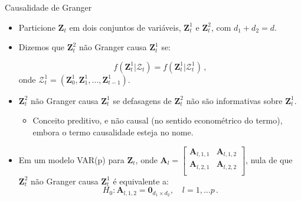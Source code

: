 \documentclass[11pt]{beamer}
\begin{document}
\begin{frame}{Causalidade de Granger}
	\begin{itemize}
		\item Particione $\boldsymbol{Z}_t$ em dois conjuntos de variáveis, $\boldsymbol{Z}^1_t$ e $\boldsymbol{Z}^2_t$, com $d_1 + d_2 = d$.
		\item Dizemos que $\boldsymbol{Z}^2_t$ {\color{blue}não Granger causa} $\boldsymbol{Z}^1_t$ se:
		
		$$f(\boldsymbol{Z}^1_t|\mathcal{Z}_{t}) = f(\boldsymbol{Z}^1_t|\mathcal{Z}^1_{t}) \,,$$
		onde $\mathcal{Z}_{t}^1 = (\boldsymbol{Z}_0^1, \boldsymbol{Z}_1^1,\ldots, \boldsymbol{Z}_{t-1}^1)$.
		\item $\boldsymbol{Z}^2_t$ {\color{blue}não Granger causa} $\boldsymbol{Z}^1_t$ se defasagens de $\boldsymbol{Z}^2_t$ não são informativas sobre $\boldsymbol{Z}^1_t$.
		\begin{itemize}
			\item {\color{red}Conceito preditivo}, e não causal (no sentido econométrico do termo), embora o termo causalidade esteja no nome.
		\end{itemize}
		\item Em um modelo VAR(p) para $\boldsymbol{Z}_t$, onde $\boldsymbol{A}_l = \begin{bmatrix}
		\boldsymbol{A}_{l,1,1} & 	\boldsymbol{A}_{l,1,2} \\
				\boldsymbol{A}_{l,2,1} & 	\boldsymbol{A}_{l,2,2} \\
		\end{bmatrix}$,
		nula de que $\boldsymbol{Z}^2_t$  não Granger causa  $\boldsymbol{Z}^1_t$  é equivalente a:
		$$H_0: 	\boldsymbol{A}_{l,1,2} = \boldsymbol{0}_{d_1\times d_2}, \quad l =1,\ldots p\, .$$
	\end{itemize}
\end{frame}
\end{document}
